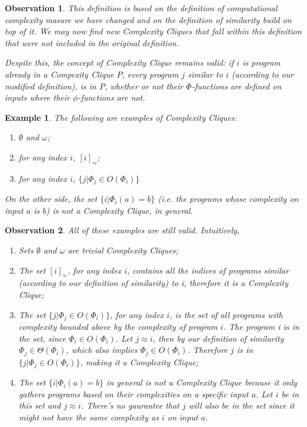 \documentclass[10pt, a4paper, oneside, titlepage, draft]{article}
\newtheorem{observation}{Observation}[shrd]
\newtheorem{example}[shrd]{Example}
\begin{document}
\begin{observation}
    This definition is based on the definition of computational complexity masure we have changed and on the definition of similarity build on top of it. We may now find new Complexity Cliques that fall within this definition that were not included in the original definition.
    
    Despite this, the concept of Complexity Clique remains valid: if $i$ is program already in a Compexity Clique $P$, every program $j$ similar to $i$ (according to our modified definition), is in $P$, whether or not their $\Phi$-functions are defined on inputs where their $\phi$-functions are not.
\end{observation}

\begin{example}
    The following are examples of Complexity Cliques:
    \begin{enumerate}
        \item $\emptyset$ and $\omega$;
        \item for any index $i$, $[i]_{\approx}$;
        \item for any index $i$, $\{ j | \Phi_j \in O(\Phi_i) \}$ 
    \end{enumerate}
    On the other side, the set $ \{ i | \Phi_i(a) = b \} $ (i.e. the programs whose complexity on input $a$ is $b$) is not a Complexity Clique, in general.
\end{example}

\begin{observation}
    All of these examples are still valid. Intuitively,
    \begin{enumerate}
        \item Sets $\emptyset$ and $\omega$ are trivial Complexity Cliques;
        \item The set $[i]_{\approx}$, for any index $i$, contains all the indices of programs similar (according to our definition of similarity) to i, therefore it is a Complexity Clique; 
        \item The set $\{j|\Phi_j \in O(\Phi_i)\}$, for any index $i$, is the set of all programs with complexity bounded above by the complexity of program $i$. The program i is in the set, since $\Phi_i \in O(\Phi_i)$. Let $j \approx i$, then by our definition of similarity $\Phi_j \in \Theta(\Phi_i)$, which also implies $\Phi_j \in O(\Phi_i)$. Therefore $j$ is in $\{j|\Phi_j \in O(\Phi_i)\}$, making it a Complexity Clique;
        \item The set $\{i | \Phi_i(a) = b\}$ in general is not a Complexity Clique because it only gathers programs based on their complexities on a specific input $a$. Let $i$ be in this set and $j \approx i$. There's no gaurantee that $j$ will also be in the set since it might not have the same complexity as $i$ on input $a$.
    \end{enumerate}
     
\end{observation}
\end{document}
